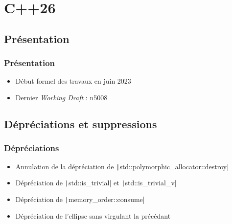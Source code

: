 \documentclass[C++.tex]{subfiles}
\begin{document}
\section{C++26}
\subsection*{Présentation}
\begin{frame}
	\frametitle{Présentation}
	\begin{itemize}
		\item Début formel des travaux en juin 2023
		\item Dernier \textit{Working Draft} : \href{https://wg21.link/std}{n5008\linklogo}
	\end{itemize}
\end{frame}

\subsection*{Dépréciations et suppressions}
\begin{frame}[fragile]
	\frametitle{Dépréciations}
	\begin{itemize}
		\item Annulation de la dépréciation de \texttt|std::polymorphic_allocator::destroy|
		\item Dépréciation de \texttt|std::is_trivial| et \texttt|std::is_trivial_v|
		\item Dépréciation de \texttt|memory_order::consume|
		\item Dépréciation de l'ellipse sans virgulant la précédant
	\end{itemize}

\end{frame}
\end{document}
